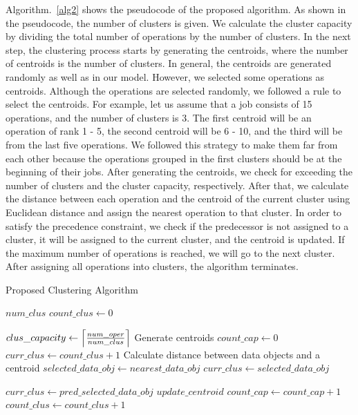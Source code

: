 \documentclass[runningheads]{llncs}
\DeclarePairedDelimiter\ceil{\lceil}{\rceil}
\begin{document}
Algorithm.~\ref{alg2} shows the pseudocode of the proposed algorithm. As shown in the pseudocode, the number of clusters is given. We calculate the cluster capacity by dividing the total number of operations by the number of clusters. In the next step, the clustering process starts by generating the centroids, where the number of centroids is the number of clusters. In general, the centroids are generated randomly as well as in our model. However, we selected some operations as centroids. Although the operations are selected randomly, we followed a rule to select the centroids. For example, let us assume that a job consists of 15 operations, and the number of clusters is $3$. The first centroid will be an operation of rank 1 - 5, the second centroid will be 6 - 10, and the third will be from the last five operations. We followed this strategy to make them far from each other because the operations grouped in the first clusters should be at the beginning of their jobs. After generating the centroids, we check for exceeding the number of clusters and the cluster capacity, respectively. After that, we calculate the distance between each operation and the centroid of the current cluster using Euclidean distance and assign the nearest operation to that cluster. In order to satisfy the precedence constraint, we check if the predecessor is not assigned to a cluster, it will be assigned to the current cluster, and the centroid is updated. If the maximum number of operations is reached, we will go to the next cluster. After assigning all operations into clusters, the algorithm terminates.

\begin{algorithm}
\caption{Proposed Clustering Algorithm}\label{alg2}
\begin{algorithmic}
\Require $num\_clus$
\State $count\_clus \gets 0$

\State $clus\_capacity \gets \ceil*{\frac{num\_oper}{num\_clus}}$
\State Generate centroids
    \State $count\_cap \gets 0$
    \State $curr\_clus \gets count\_clus + 1$
          \State Calculate distance between data objects and a centroid   
          \State $selected\_data\_obj \gets nearest\_data\_obj$
          \State $curr\_clus \gets selected\_data\_obj$    

               
              \State $curr\_clus \gets pred\_selected\_data\_obj$
          \EndIf
          \State $update\_centroid$
          \State $count\_cap \gets count\_cap + 1 $
	\EndWhile
    \State $count\_clus \gets count\_clus + 1 $
\EndWhile
\end{algorithmic}
\end{algorithm}
\end{document}
